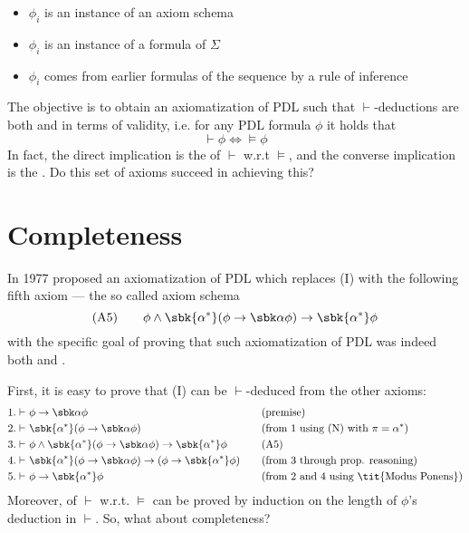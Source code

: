 \documentclass[a4paper, 12pt]{report}
\begin{document}
    \begin{itemize}
        \item $\phi_i$ is an instance of an axiom schema
        \item $\phi_i$ is an instance of a formula of $\Sigma$
        \item $\phi_i$ comes from earlier formulas of the sequence by a rule of inference
    \end{itemize}

    The objective is to obtain an axiomatization of PDL such that $\vdash$-deductions are both  and  in terms of validity, i.e. for any PDL formula $\phi$ it holds that $$\vdash \phi \iff \models \phi$$ In fact, the direct implication is the  of $\vdash$ w.r.t $\models$, and the converse implication is the . Do this set of axioms succeed in achieving this?

    \section{Completeness}

    In 1977 \textcite{segerberg} proposed an axiomatization of PDL which replaces (I) with the following fifth axiom --- the so called  axiom schema $$(\mbox A 5) \quad \quad \phi \land \sbk{\alpha ^*} (\phi \to \sbk \alpha \phi) \to \sbk{\alpha^*} \phi$$ with the specific goal of proving that such axiomatization of PDL was indeed both  and .

    First, it is easy to prove that (I) can be $\vdash$-deduced from the other axioms:
    \begin{equation*}
        \begin{alignedat}{2}
            1. \vdash & \ \phi \to \sbk \alpha \phi && \quad \quad \mbox{(premise)} \\
            2. \vdash & \ \sbk{\alpha ^*}(\phi \to \sbk \alpha \phi) && \quad \quad \mbox{(from 1 using (N) with } \pi = \alpha^*) \\
            3. \vdash & \ \phi \land \sbk{\alpha ^*} (\phi \to \sbk \alpha \phi) \to \sbk{\alpha^*} \phi && \quad \quad (\mbox A 5) \\
            4. \vdash & \ \sbk{\alpha^*}(\phi \to \sbk \alpha \phi) \to (\phi \to \sbk{\alpha^*} \phi) && \quad \quad (\mbox{from 3 through prop. reasoning}) \\
            5. \vdash & \ \phi \to \sbk{\alpha^*} \phi && \quad \quad (\mbox{from 2 and 4 using \tit{Modus Ponens}})
        \end{alignedat}
    \end{equation*}
    Moreover,  of $\vdash$ w.r.t. $\models$ can be proved by induction on the length of $\phi$'s deduction in $\vdash$. So, what about completeness?
    
\end{document}

